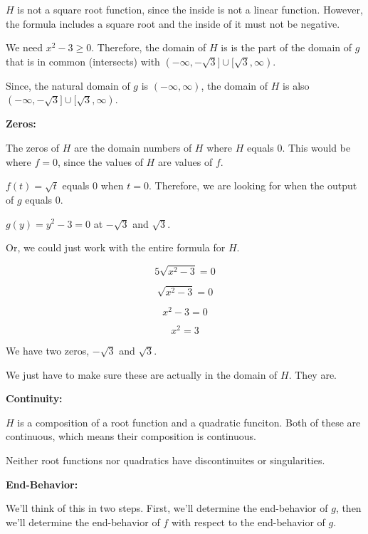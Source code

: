 \documentclass{ximera}
\begin{document}
$H$ is not a square root function, since the inside is not a linear function.  However, the formula includes a square root and the inside of it must not be negative. 

We need $x^2-3 \geq 0$.  Therefore, the domain of $H$ is is the part of the domain of $g$ that is in common (intersects) with $(-\infty, -\sqrt{3} ] \cup [ \sqrt{3}, \infty)$. 

Since, the natural domain of $g$ is $(-\infty, \infty)$, the domain of $H$ is also $(-\infty, -\sqrt{3} ] \cup [ \sqrt{3}, \infty)$. 



\textbf{\textcolor{blue!55!black}{Zeros:}} 


The zeros of $H$ are the domain numbers of $H$ where $H$ equals $0$.  This would be where $f = 0$, since the values of $H$ are values of $f$. 



$f(t) = \sqrt{t}$ equals $0$ when $t = 0$. Therefore, we are looking for when the output of $g$ equals $0$. 



$g(y) = y^2 - 3 = 0$ at $-\sqrt{3}$ and $\sqrt{3}$. 



Or, we could just work with the entire formula for $H$. 


\[
5 \sqrt{x^2-3} = 0
\]


\[
\sqrt{x^2-3} = 0
\]


\[
x^2-3 = 0
\]

\[
x^2 = 3
\]


We have two zeros, $-\sqrt{3}$ and $\sqrt{3}$. 

We just have to make sure these are actually in the domain of $H$.  They are. 






\textbf{\textcolor{blue!55!black}{Continuity:}} 


$H$ is a composition of a root function and a quadratic funciton.  Both of these are continuous, which means their composition is continuous. 

Neither root functions nor quadratics have discontinuites or singularities. 





\textbf{\textcolor{blue!55!black}{End-Behavior:}} 



We'll think of this in two steps. First, we'll determine the end-behavior of $g$, then we'll determine the end-behavior of $f$ with respect to the end-behavior of $g$.
\end{document}

